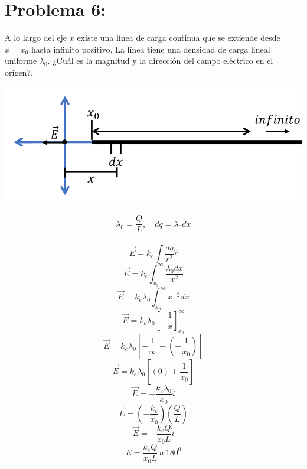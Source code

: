 \documentclass[12pt]{article}
\begin{document}
		\section{Problema 6:}\label{sec:Problema6}
			A lo largo del eje $ x $ existe una línea de carga continua que se extiende desde $ x = x_0 $
			hasta infinito positivo. La línea tiene una densidad de carga lineal uniforme $ \lambda_0 $.
			¿Cuál es la magnitud y la dirección del campo eléctrico en el origen?.
			\begin{center}
				\includegraphics[width=.5\linewidth]{Imp6t1.png} 
			\end{center}
			$$ \lambda_0 = \frac{Q}{L}, \quad dq = \lambda_0 dx $$ \\
			$$ \vec{E} = k_e \int \frac{dq}{r^2} \hat{r} $$
			$$ \vec{E} = k_e \int_{x_0}^{\infty} \frac{\lambda_0 dx}{x^2} $$
			$$ \vec{E} = k_e \lambda_0 \int_{x_0}^{\infty} x^{-2}dx $$
			$$ \vec{E} = k_e \lambda_0 \left[ - \frac{1}{x} \right]_{x_0}^{\infty}$$
			$$ \vec{E} = k_e \lambda_0 \left[ - \frac{1}{\infty} - \left( -\frac{1}{x_0} \right) \right] $$
			$$ \vec{E} = k_e \lambda_0 \left[ (0) + \frac{1}{x_0} \right] $$
			$$ \vec{E} = -\frac{k_e \lambda_0}{x_0} \hat{i} $$
			$$ \vec{E} = \left( -\frac{k_e}{x_0} \right) \left( \frac{Q}{L} \right) $$ 
			$$ \vec{E} = -\frac{k_e Q}{x_0L} \hat{i} $$
			$$ \underline{E = \frac{k_e Q}{x_0L} \: a \: 180^0} $$\\
			
\end{document}
